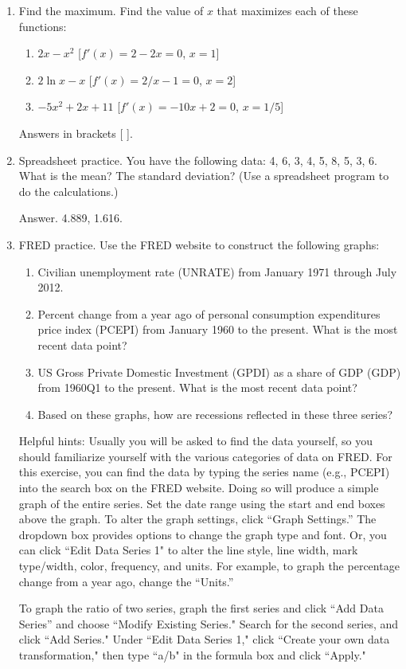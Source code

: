 \begin{enumerate}
\item Find the maximum.  Find the value of $x$ that maximizes each of these functions:
\begin{enumerate}
\item $2x-x^2$  [$f'(x) = 2-2x = 0$, $x = 1$]
\item $2 \ln x - x$ [$f'(x) = 2/x-1 = 0$, $x = 2$]
\item $-5x^2  +2x + 11$  [$f'(x) = -10x+2 = 0$, $x = 1/5$]
\end{enumerate}
Answers in brackets [ ].

\item Spreadsheet practice. You have the following data:
4, 6, 3, 4, 5, 8, 5, 3, 6.
What is the mean?  The standard deviation?
(Use a spreadsheet program to do the calculations.)

Answer.  4.889, 1.616.


\item FRED practice. Use the FRED website to construct the following graphs:
\begin{enumerate}
\item Civilian unemployment rate (UNRATE) from January 1971 through July 2012.
\item Percent change from a year ago of personal consumption expenditures price index (PCEPI) from January 1960 to the present.  What is the most recent data point?
\item US Gross Private Domestic Investment (GPDI) as a share of GDP (GDP) from 1960Q1 to the present.
What is the most recent data point?
\item Based on these graphs, how are recessions reflected in these three series?
\end{enumerate}
Helpful hints: Usually you will be asked to find the data yourself, so you should familiarize yourself with the various categories of data on FRED. For this exercise, you can find the data by typing the series name (e.g., PCEPI) into the search box on the FRED website. Doing so will produce a simple graph of the entire series.  Set the date range using the start and end boxes above the graph.  To alter the graph settings, click ``Graph Settings.'' The dropdown box provides options to change the graph type and font.  Or, you can click ``Edit Data Series 1" to alter the line style, line width, mark type/width, color, frequency, and units. For example, to graph the percentage change from a year ago, change the ``Units.''

To graph the ratio of two series, graph the first series and click ``Add Data Series'' and  choose ``Modify Existing Series."  Search for the second series, and click  ``Add Series." Under ``Edit Data Series 1," click ``Create your own data transformation," then type ``a/b" in the formula box and click ``Apply."




\end{enumerate}
